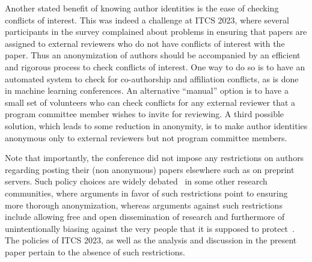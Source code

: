 \documentclass{article}
\begin{document}
Another stated benefit of knowing author identities is the ease of checking conflicts of interest. This was indeed a challenge at ITCS 2023, where several participants in the survey complained about problems in ensuring that papers are assigned to external reviewers who do not have conflicts of interest with the paper. Thus an anonymization of authors should be accompanied by an efficient and rigorous process to check conflicts of interest. One way to do so is to have an automated system to check for co-authorship and affiliation conflicts, as is done in machine learning conferences. An alternative ``manual'' option is to have a small set of volunteers who can check conflicts for any external reviewer that a program committee member wishes to invite for reviewing. A third possible solution, which leads to some reduction in anonymity, is to make author identities anonymous only to external reviewers but not program committee members. 

Note that importantly, the conference did not impose any restrictions on authors regarding posting their (non anonymous) papers elsewhere such as on preprint servers. Such policy choices are widely debated~\cite{rastogi2022arxiv} in some other research communities, where arguments in favor of such restrictions point to ensuring more thorough anonymization, whereas arguments against such restrictions include allowing free and open dissemination of research and furthermore of unintentionally biasing against the very people that it is supposed to protect~\cite[Chapter 7]{shah2022surveyextended}. The policies of ITCS 2023, as well as the analysis and discussion in the present paper pertain to the absence of such restrictions. 
\end{document}
